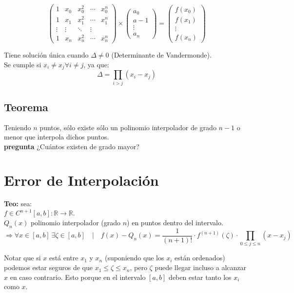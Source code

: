 \documentclass[spanish, fleqn]{article}
\begin{document}
\[\begin{pmatrix}
  1 & x_{0} & x_{0}^{2} & \cdots & x_{0}^{n} \\[0.5em]
  1 & x_{1} & x_{1}^{2} & \cdots & x_{1}^{n} \\[0.5em]
  \vdots  & \vdots  & \ddots & \vdots  \\[0.5em]
  1 & x_{n} & x_{n}^{2} & \cdots & x_{n}^{n}
\end{pmatrix}
\times
\begin{pmatrix}
  a_0 \\[0.5em]
  a-1 \\[0.5em]
  \vdots \\[0.5em]
  a_n
\end{pmatrix}
=
\begin{pmatrix}
  f(x_0) \\[0.5em]
  f(x_1) \\[0.5em]
  \vdots \\[0.5em]
  f(x_n)
\end{pmatrix}
\]

Tiene solución única cuando $\Delta \neq 0$ (Determinante de Vandermonde).\\
Se cumple si $x_i \neq x_j \forall i \neq j$, ya que:
\[\Delta = \prod_{i > j} (x_i - x_j) \]

\subsection{Teorema}
Teniendo $n$ puntos, sólo existe sólo un polinomio interpolador de grado $n-1$ o menor que interpola dichos puntos.
\\\textbf{pregunta} ¿Cuántos existen de grado mayor?

\section{Error de Interpolación}

\textbf{Teo:} sea:\\
$f \in C^{n+1} [a, b]: \mathbb{R} \rightarrow \mathbb{R}$.\\
$Q_n(x)$ polinomio interpolador (grado $n$) en puntos dentro del intervalo.\\

\[\Rightarrow \forall x \in [a, b]\ \exists \zeta \in [a, b] \quad | \quad f(x) - Q_n(x) = \frac{1}{(n+1)!} \cdot f^{(n+1)}(\zeta) \cdot \prod_{0 \leqslant j \leqslant n} (x-x_j) \]

Notar que si $x$ está entre $x_1$ y $x_n$ (suponiendo que los $x_i$ están ordenados) podemos estar seguros de que $x_1 \leq \zeta \leq x_n$, pero $\zeta$ puede llegar incluso a alcanzar $x$ en caso contrario. Esto porque en el intervalo $[a,b]$ deben estar tanto los $x_i$ como $x$.
\end{document}
